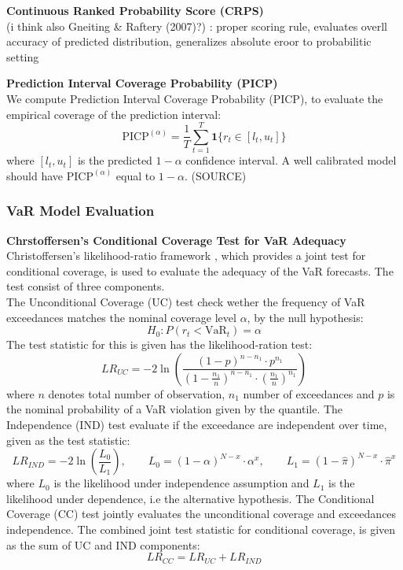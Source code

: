 \textbf{Continuous Ranked Probability Score (CRPS)} \\
(i think also Gneiting \& Raftery (2007)?) : 
proper scoring rule, evaluates overll accuracy of predicted distribution, generalizes absolute eroor to probabilitic setting


\textbf{Prediction Interval Coverage Probability (PICP)} \\
We compute Prediction Interval Coverage Probability (PICP), to evaluate the empirical coverage of the prediction interval:
\begin{equation}
    \text{PICP}^{(\alpha)} = \frac{1}{T} \sum_{t=1}^T \mathbf{1}\{r_t \in [l_t, u_t]\}
\end{equation}
where $[l_t, u_t]$ is the predicted $1-\alpha$ confidence interval. A well calibrated model should have $\text{PICP}^{(\alpha)}$ equal to $1-\alpha$. (SOURCE)


\subsubsection{VaR Model Evaluation} 
\textbf{Chrstoffersen's Conditional Coverage Test for VaR Adequacy} \\ 
Christoffersen's likelihood-ratio framework \parencite{christoffersen1998}, which provides a joint test for conditional coverage, is used to evaluate the adequacy of the VaR forecasts. The test consist of three components. \\ 
The Unconditional Coverage (UC) test check wether the frequency of VaR exceedances matches the nominal coverage level $\alpha$, by the null hypothesis: 
\begin{equation}
    H_0 : P(r_t < \text{VaR}_t) = \alpha
\end{equation}
The test statistic for this is given has the likelihood-ration test: 
\begin{equation}
    LR_{UC} = -2 \ln \left( \frac{ (1-p)^{n-n_1} \cdot p^{n_1} }{ \left(1 - \frac{n_1}{n} \right)^{n-n_1} \cdot \left( \frac{n_1}{n} \right)^{n_1} } \right)
\end{equation}
where $n$ denotes total number of observation, $n_1$ number of exceedances and $p$ is the nominal probability of a VaR violation given by the quantile. The Independence (IND) test evaluate if the exceedance are independent over time, given as the test statistic:  
\begin{equation}
    LR_{IND} = -2 \ln \left( \frac{L_0}{L_1} \right), \qquad  L_0 = (1 - \alpha)^{N-x} \cdot \alpha^x, \qquad L_1 = (1 - \hat{\pi})^{N-x} \cdot \hat{\pi}^x
\end{equation}
where $L_0$ is the likelihood under independence assumption and $L_1$ is the likelihood under dependence, i.e the alternative hypothesis. The Conditional Coverage (CC) test jointly evaluates the unconditional coverage and exceedances independence. The combined joint test statistic for conditional coverage, is given as the sum of UC and IND components:
\begin{equation}
    LR_{CC} = LR_{UC} + LR_{IND}
\end{equation}

